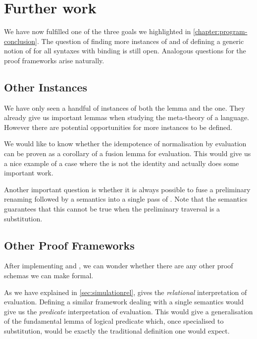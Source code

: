
\section{Further work}

We have now fulfilled one of the three goals we highlighted in \cref{chapter:program-conclusion}.
The question of finding more instances of  and of defining a generic notion of
 for all syntaxes with binding is still open. Analogous questions for the proof
frameworks arise naturally.


\subsection{Other Instances}

We have only seen a handful of instances of both the  lemma and the 
one. They already give us important lemmas when studying the meta-theory of a language. However
there are potential opportunities for more instances to be defined.

We would like to know whether the idempotence of normalisation by evaluation can be proven as a
corollary of a fusion lemma for evaluation. This would give us a nice example of a case where
the  is not the identity and actually does some important work.

Another important question is whether it is always possible to fuse a preliminary renaming
followed by a semantics  into a single pass of . Note that the 
semantics guarantees that this cannot be true when the preliminary traversal is a substitution.

\subsection{Other Proof Frameworks}

After implementing  and , we can wonder whether there are any other
proof schemas we can make formal.

As we have explained in \cref{sec:simulationrel},  gives the \emph{relational}
interpretation of evaluation. Defining a similar framework dealing with a single semantics would
give us the \emph{predicate} interpretation of evaluation. This would give a generalisation of
the fundamental lemma of logical predicate which, once specialised to substitution, would be
exactly the traditional definition one would expect.


